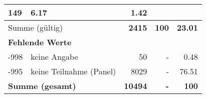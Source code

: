 \begin{longtable}{lXrrr}
       \num{149} &
       \num[round-mode=places,round-precision=2]{6,17} &
         \num[round-mode=places,round-precision=2]{1,42} \\
     \midrule
     \multicolumn{2}{l}{Summe (gültig)} &
       \textbf{\num{2415}} &
     \textbf{100} &
       \textbf{\num[round-mode=places,round-precision=2]{23,01}} \\
     \multicolumn{5}{l}{\textbf{Fehlende Werte}}\\
       -998 &
       keine Angabe &
         \num{50} &
        - &
         \num[round-mode=places,round-precision=2]{0,48} \\
       -995 &
       keine Teilnahme (Panel) &
         \num{8029} &
        - &
         \num[round-mode=places,round-precision=2]{76,51} \\
     \midrule
     \multicolumn{2}{l}{\textbf{Summe (gesamt)}} &
          \textbf{\num{10494}} &
        \textbf{-} &
        \textbf{100} \\
     \bottomrule
     \end{longtable}
     
